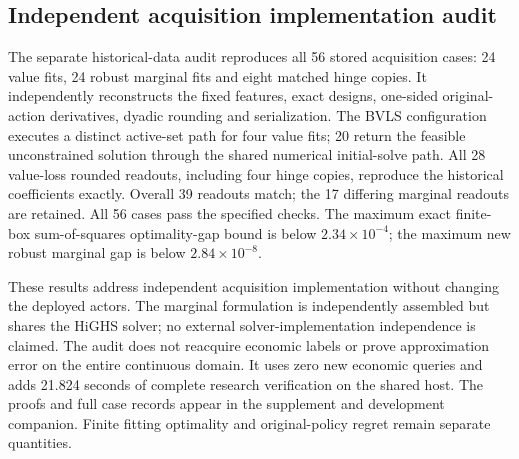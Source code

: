 \subsection{Independent acquisition implementation audit}
\label{sec:fitauditresults126}
The separate historical-data audit reproduces all 56 stored acquisition cases:
24 value fits, 24 robust marginal fits and eight matched hinge copies.  It
independently reconstructs the fixed features, exact designs, one-sided
original-action derivatives, dyadic rounding and serialization.  The BVLS configuration executes a distinct active-set path for four value
fits; 20 return the feasible unconstrained solution through the shared numerical
initial-solve path. All 28 value-loss rounded readouts, including four hinge
copies, reproduce the historical coefficients exactly.
Overall 39 readouts match; the 17 differing marginal readouts are retained.
All 56 cases pass the specified checks.  The maximum exact finite-box
sum-of-squares optimality-gap bound is below $2.34\times10^{-4}$; the
maximum new robust marginal gap is below $2.84\times10^{-8}$.

These results address independent acquisition implementation without changing
the deployed actors.  The marginal formulation is independently assembled but
shares the HiGHS solver; no external solver-implementation independence is
claimed.  The audit does not reacquire economic labels or prove approximation
error on the entire continuous domain.  It uses zero new economic queries and
adds 21.824 seconds of complete research verification on the shared host.
The proofs and full case records appear in the supplement and development
companion.  Finite fitting optimality and original-policy regret remain
separate quantities.

